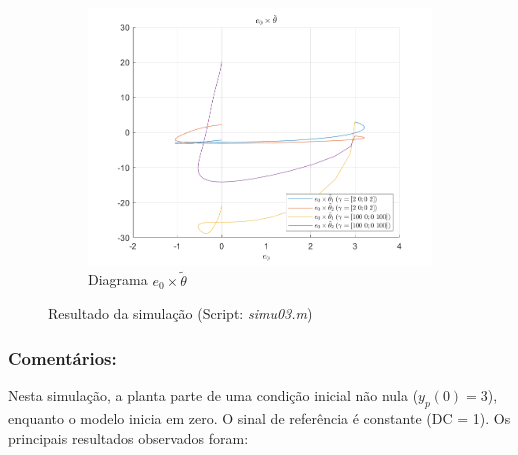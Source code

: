 \documentclass[10pt]{article}
\begin{document}
\begin{figure}[h!]
    \begin{subfigure}[b]{0.35\textwidth}
        \centering
        \includegraphics[width=\textwidth]{img/fig03d.png}
        \caption{Diagrama $e_0 \times \tilde{\theta}$}
    \end{subfigure}

    \caption{Resultado da simulação (Script: \textit{simu03.m})}
    \label{fig:sim3}
\end{figure}

\subsubsection{Comentários:}

Nesta simulação, a planta parte de uma condição inicial não nula ($y_p(0) = 3$), enquanto o modelo inicia em zero. O sinal de referência é constante (DC = 1). Os principais resultados observados foram:
\end{document}
